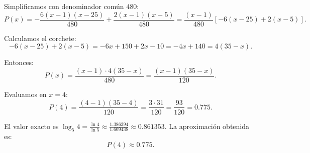 \documentclass[12pt]{article}
\begin{document}
	Simplificamos con denominador común \( 480 \):
	\[
	P(x) = -\frac{6(x-1)(x-25)}{480} + \frac{2(x-1)(x-5)}{480} = \frac{(x-1)}{480} \left[ -6(x-25) + 2(x-5) \right].
	\]
	
	Calculamos el corchete:
	\[
	-6(x-25) + 2(x-5) = -6x + 150 + 2x - 10 = -4x + 140 = 4(35 - x).
	\]
	
	Entonces:
	\[
	P(x) = \frac{(x-1) \cdot 4(35 - x)}{480} = \frac{(x-1)(35 - x)}{120}.
	\]
	
	Evaluamos en \( x = 4 \):
	\[
	P(4) = \frac{(4-1)(35 - 4)}{120} = \frac{3 \cdot 31}{120} = \frac{93}{120} = 0.775.
	\]
	
	El valor exacto es \( \log_5 4 = \frac{\ln 4}{\ln 5} \approx \frac{1.386294}{1.609438} \approx 0.861353 \).  
	La aproximación obtenida es:
	\[
	\boxed{P(4) \approx 0.775}.
	\]
	
\end{document}
